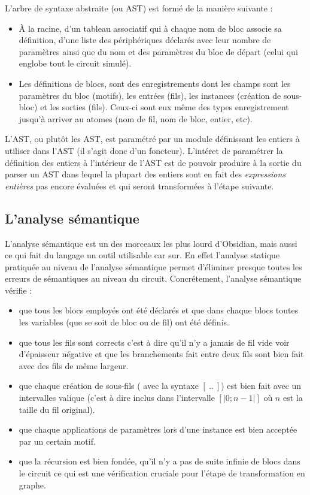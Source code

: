 \documentclass[13pt]{article}
\begin{document}
L'arbre de syntaxe abstraite (ou AST) est formé de la manière suivante :
\begin{itemize}
\item À la racine, d'un tableau associatif qui à chaque nom de bloc associe sa
  définition, d'une liste des périphériques déclarés avec leur nombre de
  paramètres ainsi que du nom et des paramètres du bloc de départ (celui qui
  englobe tout le circuit simulé).
\item Les définitions de blocs, sont des enregistrements dont les champs sont
  les paramètres du bloc (motifs), les entrées (fils), les instances (création
  de sous-bloc) et les sorties (fils). Ceux-ci sont eux même des types
  enregistrement jusqu'à arriver au atomes (nom de fil, nom de bloc, entier, etc).
\end{itemize}

L'AST, ou plutôt les AST, est paramétré par un module définissant les entiers à
utiliser dans l'AST (il s'agit donc d'un foncteur). L'intéret de paramétrer la
définition des entiers à l'intérieur de l'AST est de pouvoir produire à la
sortie du parser un AST dans lequel la plupart des \og entiers\fg{} sont en fait
des \emph{expressions entières} pas encore évaluées et qui seront transformées à
l'étape suivante.

\subsection{L'analyse sémantique}

L'analyse sémantique est un des morceaux les plus lourd d'Obsidian, mais aussi
ce qui fait du langage un outil utilisable car sur. En effet l'analyse statique
pratiquée au niveau de l'analyse sémantique permet d'éliminer presque toutes les
erreurs de sémantiques au niveau du circuit. Concrétement, l'analyse sémantique
vérifie :
\begin{itemize}
\item que tous les blocs employés ont été déclarés et que dans chaque blocs
  toutes les variables (que se soit de bloc ou de fil) ont été définis.
\item que tous les fils sont corrects c'est à dire qu'il n'y a jamais de fil
  vide voir d'épaisseur négative et que les branchements fait entre deux fils
  sont bien fait avec des fils de même largeur.
\item que chaque création de sous-fils ( avec la syntaxe $[\ ..\ ]$) est bien
  fait avec un intervalles valique (c'est à dire inclus dans l'intervalle $[| 0
  ; n - 1|]$ où $n$ est la taille du fil original).
\item que chaque applications de paramètres lors d'une instance est bien
  acceptée par un certain motif.
\item que la récursion est bien fondée, qu'il n'y a pas de suite infinie de
  blocs dans le circuit ce qui est une vérification cruciale pour l'étape de
  transformation en graphe. 
\end{itemize}
\end{document}
